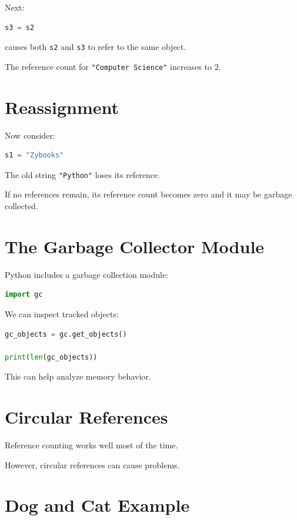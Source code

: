 \documentclass[11pt]{article}
\begin{document}
Next:

\begin{lstlisting}[language=Python]
s3 = s2
\end{lstlisting}

causes both \verb|s2| and \verb|s3| to refer to the same object.

The reference count for \verb|"Computer Science"| increases to 2.

\section{Reassignment}

Now consider:

\begin{lstlisting}[language=Python]
s1 = "Zybooks"
\end{lstlisting}

The old string \verb|"Python"| loses its reference.

If no references remain, its reference count becomes zero and it may be garbage collected.

\section{The Garbage Collector Module}

Python includes a garbage collection module:

\begin{lstlisting}[language=Python]
import gc
\end{lstlisting}

We can inspect tracked objects:

\begin{lstlisting}[language=Python]
gc_objects = gc.get_objects()

print(len(gc_objects))
\end{lstlisting}

This can help analyze memory behavior.

\section{Circular References}

Reference counting works well most of the time.

However, circular references can cause problems.

\section{Dog and Cat Example}
\end{document}
